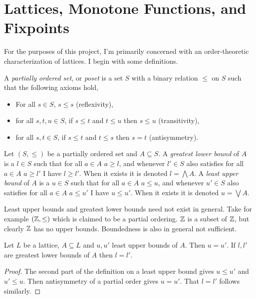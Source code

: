 \section{Lattices, Monotone Functions, and Fixpoints}
For the purposes of this project, I'm primarily concerned with an order-theoretic characterization of lattices.
I begin with some definitions.
\begin{definition}[Poset]\label{posetdef}
  A \emph{partially ordered set}, or \emph{poset} is a set $S$ with a binary relation $\leq$ on $S$ such that the following axioms hold,
  \begin{itemize}
    \item For all $s \in S$, $s \leq s$ (reflexivity),
    \item for all $s, t, u \in S$, if $s \leq t$ and $t \leq u$ then $s \leq u$ (transitivity),
    \item for all $s, t \in S$, if $s \leq t$ and $t \leq s$ then $s = t$ (antisymmetry).
  \end{itemize}
\end{definition}
\begin{definition}
  Let $(S, \leq)$ be a partially ordered set and $A \subseteq S$. A \emph{greatest lower bound} of $A$ is
  a $l \in S$ such that for all $a \in A$ $a \geq l$, and whenever $l' \in S$ also satisfies for all $a \in A$
  $a \geq l'$ I have $l \geq l'$. When it exists it is denoted $l = \bigwedge A$. 
  A \emph{least upper bound} of $A$ is a $u \in S$ such that for all $a \in A$ $a \leq u$, and whenever $u' \in S$ also satisfies for all $a \in A$
  $a \leq u'$ I have $u \leq u'$. When it exists it is denoted $u = \bigvee A$.
\end{definition}
\begin{remark}
  Least upper bounds and greatest lower bounds need not exist in general. Take for example $(\mathbb{Z}, \leq)$ which
  is claimed to be a partial ordering. $\mathbb{Z}$ is a subset of $\mathbb{Z}$, but clearly $\mathbb{Z}$ has no upper bounds.
  Boundedness is also in general not sufficient. 
\end{remark}
\begin{lemma}
  Let $L$ be a lattice, $A \subseteq L$ and $u, u'$ least upper bounds of $A$. Then $u = u'$.
  If $l, l'$ are greatest lower bounds of $A$ then $l = l'$.
\end{lemma}
\begin{proof}
  The second part of the definition on a least upper bound gives $u \leq u'$ and $u' \leq u$. Then
  antisymmetry of a partial order gives $u = u'$. That $l = l'$ follows similarly.
\end{proof}
